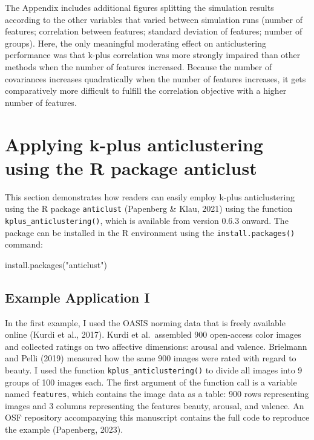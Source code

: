 \documentclass[
  man,floatsintext]{apa7}
\newenvironment{Shaded}{\begin{snugshade}}{\end{snugshade}}
\newcommand{\FunctionTok}[1]{\textcolor[rgb]{0.00,0.00,0.00}{#1}}
\newcommand{\NormalTok}[1]{#1}
\newcommand{\StringTok}[1]{\textcolor[rgb]{0.31,0.60,0.02}{#1}}
\begin{document}
The Appendix includes additional figures splitting the simulation results according to the other variables that varied between simulation runs (number of features; correlation between features; standard deviation of features; number of groups). Here, the only meaningful moderating effect on anticlustering performance was that k-plus correlation was more strongly impaired than other methods when the number of features increased. Because the number of covariances increases quadratically when the number of features increases, it gets comparatively more difficult to fulfill the correlation objective with a higher number of features.

\hypertarget{applying-k-plus-anticlustering-using-the-r-package-anticlust}{%
\section{Applying k-plus anticlustering using the R package anticlust}\label{applying-k-plus-anticlustering-using-the-r-package-anticlust}}

This section demonstrates how readers can easily employ k-plus anticlustering using the R package \texttt{anticlust} (Papenberg \& Klau, 2021) using the function \texttt{kplus\_anticlustering()}, which is available from version 0.6.3 onward. The package can be installed in the R environment using the \texttt{install.packages()} command:

\begin{Shaded}
\begin{Highlighting}[]
\FunctionTok{install.packages}\NormalTok{(}\StringTok{"anticlust"}\NormalTok{)}
\end{Highlighting}
\end{Shaded}

\hypertarget{example-application-i}{%
\subsection{Example Application I}\label{example-application-i}}

In the first example, I used the OASIS norming data that is freely available online (Kurdi et al., 2017). Kurdi et al.~assembled 900 open-access color images and collected ratings on two affective dimensions: arousal and valence. Brielmann and Pelli (2019) measured how the same 900 images were rated with regard to beauty. I used the function \texttt{kplus\_anticlustering()} to divide all images into 9 groups of 100 images each. The first argument of the function call is a variable named \texttt{features}, which contains the image data as a table: 900 rows representing images and 3 columns representing the features beauty, arousal, and valence. An OSF repository accompanying this manuscript contains the full code to reproduce the example (Papenberg, 2023).
\end{document}
